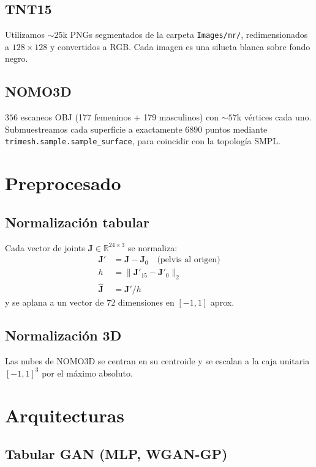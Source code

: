 \documentclass[11pt,a4paper,twocolumn]{article}
\begin{document}
\subsection{TNT15}
Utilizamos $\sim 25$k PNGs segmentados de la carpeta
\texttt{Images/mr/}, redimensionados a $128\times 128$ y convertidos a
RGB. Cada imagen es una silueta blanca sobre fondo negro.

\subsection{NOMO3D}
$356$ escaneos OBJ (177 femeninos + 179 masculinos) con $\sim 57$k
vértices cada uno. Submuestreamos cada superficie a exactamente $6890$
puntos mediante \texttt{trimesh.sample.sample\_surface}, para coincidir
con la topología SMPL.

\section{Preprocesado}

\subsection{Normalización tabular}
Cada vector de joints $\mathbf{J}\in\mathbb{R}^{24\times 3}$ se
normaliza:
\begin{align}
\mathbf{J}' &= \mathbf{J} - \mathbf{J}_0 \quad\text{(pelvis al origen)}\\
h &= \|\mathbf{J}'_{15} - \mathbf{J}'_0\|_2 \\
\hat{\mathbf{J}} &= \mathbf{J}' / h
\end{align}
y se aplana a un vector de $72$ dimensiones en $[-1,1]$ aprox.

\subsection{Normalización 3D}
Las nubes de NOMO3D se centran en su centroide y se escalan a la caja
unitaria $[-1,1]^3$ por el máximo absoluto.

\section{Arquitecturas}

\subsection{Tabular GAN (MLP, WGAN-GP)}
\end{document}
